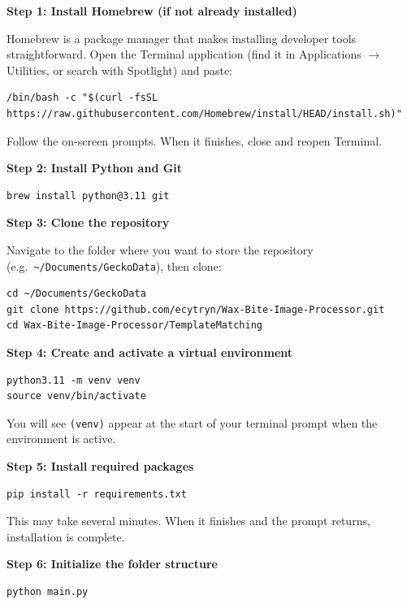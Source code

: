 \documentclass[11pt, letterpaper]{article}
\begin{document}
\textbf{Step 1: Install Homebrew (if not already installed)}

Homebrew is a package manager that makes installing developer tools straightforward.
Open the Terminal application (find it in Applications $\to$ Utilities, or search with
Spotlight) and paste:

\begin{lstlisting}
/bin/bash -c "$(curl -fsSL https://raw.githubusercontent.com/Homebrew/install/HEAD/install.sh)"
\end{lstlisting}

Follow the on-screen prompts. When it finishes, close and reopen Terminal.

\textbf{Step 2: Install Python and Git}

\begin{lstlisting}
brew install python@3.11 git
\end{lstlisting}

\textbf{Step 3: Clone the repository}

Navigate to the folder where you want to store the repository (e.g.\ \texttt{\textasciitilde/Documents/GeckoData}),
then clone:

\begin{lstlisting}
cd ~/Documents/GeckoData
git clone https://github.com/ecytryn/Wax-Bite-Image-Processor.git
cd Wax-Bite-Image-Processor/TemplateMatching
\end{lstlisting}

\textbf{Step 4: Create and activate a virtual environment}

\begin{lstlisting}
python3.11 -m venv venv
source venv/bin/activate
\end{lstlisting}

You will see \texttt{(venv)} appear at the start of your terminal prompt when the environment
is active.

\textbf{Step 5: Install required packages}

\begin{lstlisting}
pip install -r requirements.txt
\end{lstlisting}

This may take several minutes. When it finishes and the prompt returns, installation is complete.

\textbf{Step 6: Initialize the folder structure}

\begin{lstlisting}
python main.py
\end{lstlisting}
\end{document}
